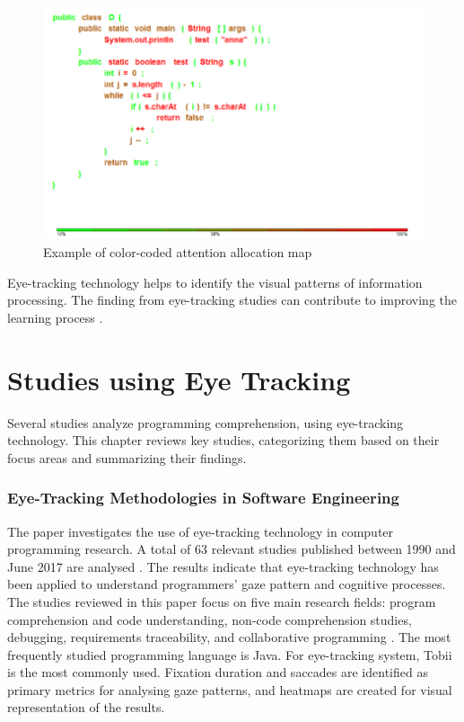 \begin{figure} [H]
  \centering
  \includegraphics[scale=1]{figures/collor.png}
  \caption{Example of color-coded attention allocation map \cite{sharafi2015systematic} } 
  \label{fig:AnhangsChor}
\end{figure}

Eye-tracking technology helps to identify the visual patterns of information processing. 
The finding from eye-tracking studies can contribute to improving the learning process \cite{andrzejewska2020development}.




\section{Studies using Eye Tracking}

Several studies analyze programming comprehension, using eye-tracking technology. This chapter reviews key studies, categorizing them based on their focus areas and summarizing their findings.

\subsubsection{Eye-Tracking Methodologies in Software Engineering}
The paper \citet{obaidellah2018survey} investigates the use of eye-tracking technology in computer programming research. A total of 63 relevant studies published between 1990 and June 2017 are analysed \citet{obaidellah2018survey}. The results indicate that eye-tracking technology has been applied to understand programmers' gaze pattern and cognitive processes. The studies reviewed in this paper focus on five main research fields: program comprehension and code understanding, non-code comprehension studies, debugging, requirements traceability, and collaborative programming \citet{obaidellah2018survey}.  The most frequently studied programming language is Java.  
For eye-tracking system, Tobii is the most commonly used.  Fixation duration and saccades are identified as primary metrics for analysing gaze patterns, and heatmaps are created for visual representation of the results.


